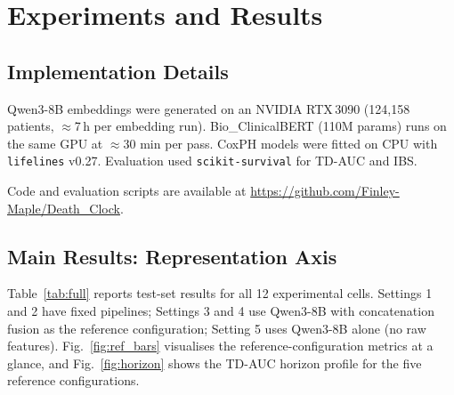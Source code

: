 \section{Experiments and Results}

\subsection{Implementation Details}
Qwen3-8B embeddings were generated on an NVIDIA RTX\,3090
(124{,}158 patients, $\approx$7\,h per embedding run).
Bio\_ClinicalBERT (110M params) runs on the same GPU at
$\approx$30 min per pass.
CoxPH models were fitted on CPU with \texttt{lifelines} v0.27.
Evaluation used \texttt{scikit-survival} for TD-AUC and IBS.
\begin{sloppypar}Code and evaluation scripts are available at
\url{https://github.com/Finley-Maple/Death_Clock}.\end{sloppypar}

\subsection{Main Results: Representation Axis}

Table~\ref{tab:full} reports test-set results for all 12 experimental cells.
Settings 1 and 2 have fixed pipelines; Settings 3 and 4 use Qwen3-8B with
concatenation fusion as the reference configuration; Setting 5 uses Qwen3-8B
alone (no raw features).
Fig.~\ref{fig:ref_bars} visualises the reference-configuration metrics at a
glance, and Fig.~\ref{fig:horizon} shows the TD-AUC horizon profile for the
five reference configurations.

